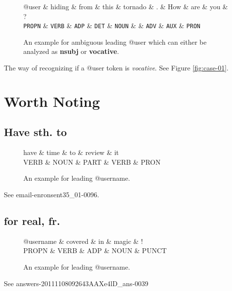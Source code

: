 \documentclass[11pt,a4paper]{article}
\begin{document}
\begin{figure}[t]
	\centering
	\small
	\begin{dependency}[edge slant=2, text only label, label style=above]
		\begin{deptext}
			@user  \& hiding \& from \& this \& tornado \& . \& How \& are \& you \& ? \\
			\texttt{PROPN} \& \texttt{VERB} \& \texttt{ADP} \& \texttt{DET} \& \texttt{NOUN} \& \& \texttt{ADV} \& \texttt{AUX} \& \texttt{PRON} \\
		\end{deptext}
	\end{dependency}
	\caption{An example for ambiguous leading @user which can either be analyzed as \textbf{nsubj} or \textbf{vocative}.}\label{fig:abnormal-vocative}
\end{figure}

The way of recognizing if a @user token is \textit{vocative}.
See Figure \ref{fig:case-01}.


\section{Worth Noting}
\subsection{Have sth. to}
\begin{figure}[t]
	\centering
	\small
	\begin{dependency}[edge slant=2, text only label, label style=above]
		\begin{deptext}
			have \& time \& to \& review \& it \\
			VERB \& NOUN \& PART \& VERB \& PRON \\
		\end{deptext}
	\end{dependency}
	\caption{An example for leading @username.}\label{fig:case-04}
\end{figure}
See email-enronsent35\_01-0096.


\subsection{for real, fr.}
\begin{figure}[t]
	\centering
	\small
	\begin{dependency}[edge slant=2, text only label, label style=above]
		\begin{deptext}
			@username \& covered \& in \& magic \& ! \\
			PROPN \& VERB \& ADP \& NOUN \& PUNCT \\
		\end{deptext}
	\end{dependency}
	\caption{An example for leading @username.}\label{fig:case-06}
\end{figure}
See answers-20111108092643AAXe4lD\_ans-0039
\end{document}
